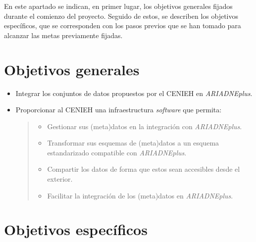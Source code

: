 
En este apartado se indican, en primer lugar, los objetivos generales
fijados durante el comienzo del proyecto. Seguido de estos, se describen
los objetivos específicos, que se corresponden con los pasos previos que
se han tomado para alcanzar las metas previamente fijadas.

\section{Objetivos generales}\label{obj.gen}

\begin{itemize}
\tightlist
\item
  Integrar los conjuntos de datos propuestos por el CENIEH en
  \emph{ARIADNEplus}.
\item
  Proporcionar al CENIEH una infraestructura \emph{software} que
  permita:

  \begin{quote}
  \begin{itemize}
  \tightlist
  \item
    Gestionar sus (meta)datos en la integración con \emph{ARIADNEplus}.
  \item
    Transformar sus esquemas de (meta)datos a un esquema estandarizado
    compatible con \emph{ARIADNEplus}.
  \item
    Compartir los datos de forma que estos sean accesibles desde el
    exterior.
  \item
    Facilitar la integración de los (meta)datos en \emph{ARIADNEplus}.
  \end{itemize}
  \end{quote}
\end{itemize}

\section{Objetivos específicos}\label{obj.esp}

